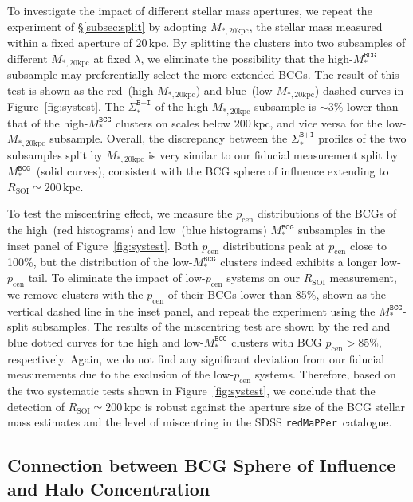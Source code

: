\documentclass[fleqn,usenatbib]{mnras}
\newcommand{\rsoi}{R_{\mathrm{SOI}}}
\newcommand{\sigbi}{\Sigma_*^{\texttt{B+I}}}
\newcommand{\msbcg}{M_*^{\texttt{BCG}}}
\newcommand{\mtwenty}{M_{*,20\kpc}}
\newcommand{\kpc}{\mathrm{kpc}}
\newcommand{\pcen}{p_{\mathrm{cen}}}
\newcommand\redmapper{\texttt{redMaPPer}}
\begin{document}
To investigate the impact of different stellar mass apertures, we repeat
the experiment of \S\ref{subsec:split} by adopting $\mtwenty$, the stellar
mass measured within a fixed aperture of $20\,\kpc$. By splitting the
clusters into two subsamples of different $\mtwenty$ at fixed $\lambda$, we
eliminate the possibility that the high-$\msbcg$ subsample may
preferentially select the more extended BCGs. The result of this test is
shown as the red~(high-$\mtwenty$) and blue~(low-$\mtwenty$) dashed curves
in Figure~\ref{fig:systest}.  The
$\sigbi$ of the high-$\mtwenty$ subsample is ${\sim}3\%$ lower than that
of the high-$\msbcg$ clusters on scales below $200\,\kpc$,
and vice versa for the low-$\mtwenty$ subsample.
Overall, the discrepancy between the
$\sigbi$ profiles of the two subsamples split by $\mtwenty$ is very similar
to our fiducial measurement split by $\msbcg$~(solid curves), consistent
with the BCG sphere of influence extending to $\rsoi{\simeq}200\,\kpc$.



To test the miscentring effect, we measure the $\pcen$ distributions of the
BCGs of the high~(red histograms) and low~(blue histograms) $\msbcg$
subsamples in the inset panel of Figure~\ref{fig:systest}.  Both $\pcen$
distributions peak at $\pcen$ close to 100\%, but the distribution of the
low-$\msbcg$ clusters indeed exhibits a longer low-$\pcen$ tail.  To
eliminate the impact of low-$\pcen$ systems on our $\rsoi$ measurement, we
remove clusters with the $\pcen$ of their BCGs lower than 85\%, shown as
the vertical dashed line in the inset panel, and repeat the experiment
using the $\msbcg$-split subsamples.  The results of the miscentring test
are shown by the red and blue dotted curves for the high and low-$\msbcg$
clusters with BCG $\pcen{>}85\%$, respectively. Again, we do not find any
significant deviation from our fiducial measurements due to the exclusion
of the low-$\pcen$ systems.  Therefore, based on the two systematic tests
shown in Figure~\ref{fig:systest}, we conclude that the detection of
$\rsoi{\simeq}200\,\kpc$ is robust against the aperture size of the BCG
stellar mass estimates and the level of miscentring in the SDSS
\redmapper~catalogue.


\subsection{Connection between BCG Sphere of Influence and Halo Concentration}
\label{subsec:physics}
\end{document}
